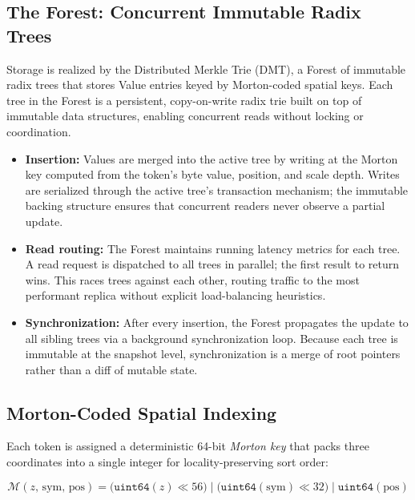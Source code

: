 \subsection{The Forest: Concurrent Immutable Radix Trees}
\label{sec:dmt_forest}

Storage is realized by the Distributed Merkle Trie (DMT), a Forest of immutable radix trees that stores Value entries keyed by Morton-coded spatial keys. Each tree in the Forest is a persistent, copy-on-write radix trie built on top of immutable data structures, enabling concurrent reads without locking or coordination.

\begin{itemize}[nosep]
  \item \textbf{Insertion:} Values are merged into the active tree by writing
        at the Morton key computed from the token's byte value, position,
        and scale depth. Writes are serialized through the active tree's
        transaction mechanism; the immutable backing structure ensures that
        concurrent readers never observe a partial update.
  \item \textbf{Read routing:} The Forest maintains running latency metrics
        for each tree.  A read request is dispatched to all trees in
        parallel; the first result to return wins.  This races trees
        against each other, routing traffic to the most performant replica
        without explicit load-balancing heuristics.
  \item \textbf{Synchronization:} After every insertion, the Forest
        propagates the update to all sibling trees via a background
        synchronization loop.  Because each tree is immutable at the
        snapshot level, synchronization is a merge of root pointers
        rather than a diff of mutable state.
\end{itemize}

\subsection{Morton-Coded Spatial Indexing}
\label{sec:morton_codes}

Each token is assigned a deterministic 64-bit \emph{Morton key} that packs
three coordinates into a single integer for locality-preserving sort order:

\begin{equation}
  \mathcal{M}(z,\,\text{sym},\,\text{pos})
    = \bigl(\texttt{uint64}(z) \ll 56\bigr)
    \;\big|\;
      \bigl(\texttt{uint64}(\text{sym}) \ll 32\bigr)
    \;\big|\;
      \texttt{uint64}(\text{pos})
  \label{eq:morton_key}
\end{equation}

